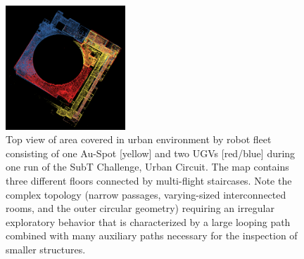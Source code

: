 \documentclass[letterpaper, 10pt, conference]{ieeeconf}      %
\begin{document}
\begin{figure}[t!]
  \centering
  \includegraphics[width=0.4\textwidth]{spot_iros/graphics/coverage_matteo.png}  %
  \caption{Top view of area covered in urban environment by robot fleet consisting of one Au-Spot [yellow] and two UGVs [red/blue] during one run of the SubT Challenge, Urban Circuit. The map contains three different floors connected by multi-flight staircases. Note the complex topology (narrow passages, varying-sized interconnected rooms, and the outer circular geometry) requiring an irregular exploratory behavior that is characterized by a large looping path combined with many auxiliary paths necessary for the inspection of smaller structures.}
  \label{fig:exploration_planner_topview}
\end{figure}

  
  
  
\end{document}
